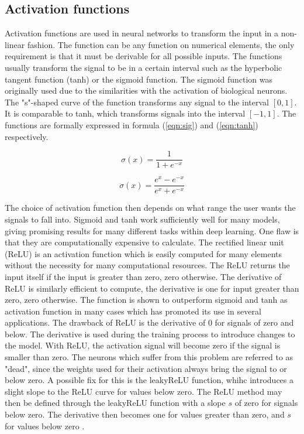\subsection{Activation functions}

Activation functions are used in neural networks to transform the input in a non-linear fashion. The function can be any function on numerical elements, the only requirement is that it must be derivable for all possible inputs. The functions usually transform the signal to be in a certain interval such as the hyperbolic tangent function (tanh) or the sigmoid function. The sigmoid function was originally used due to the similarities with the activation of biological neurons. The "s"-shaped curve of the function transforms any signal to the interval $[0, 1]$. It is comparable to tanh, which transforms signals into the interval $[-1, 1]$. The functions are formally expressed in formula (\ref{eqn:sig}) and (\ref{eqn:tanh}) respectively.

\begin{equation}
\label{eqn:sig}
\sigma(x) = \frac{1}{1+e^{-x}}
\end{equation}

\begin{equation}
\label{eqn:tanh}
\sigma(x) = \frac{e^x - e^{-x}}{e^x + e^{-x}}
\end{equation}

The choice of activation function then depends on what range the user wants the signals to fall into. Sigmoid and tanh work sufficiently well for many models, giving promising results for many different tasks within deep learning. One flaw is that they are computationally expensive to calculate. The rectified linear unit (ReLU) is an activation function which is easily computed for many elements without the necessity for many computational resources. The ReLU returns the input itself if the input is greater than zero, zero otherwise. The derivative of ReLU is similarly efficient to compute, the derivative is one for input greater than zero, zero otherwise. The function is shown to outperform sigmoid and tanh as activation function in many cases which has promoted its use in several applications. The drawback of ReLU is the derivative of 0 for signals of zero and below. The derivative is used during the training process to introduce changes to the model. With ReLU, the activation signal will become zero if the signal is smaller than zero. The neurons which suffer from this problem are referred to as "dead", since the weights used for their activation always bring the signal to or below zero. A possible fix for this is the leakyReLU function, whihc introduces a slight slope to the ReLU curve for values below zero. The ReLU method may then be defined through the leakyReLU function with a slope $s$ of zero for signals below zero. The derivative then becomes one for values greater than zero, and $s$ for values below zero \cite{agarap2018deep, lu2019dying}.

